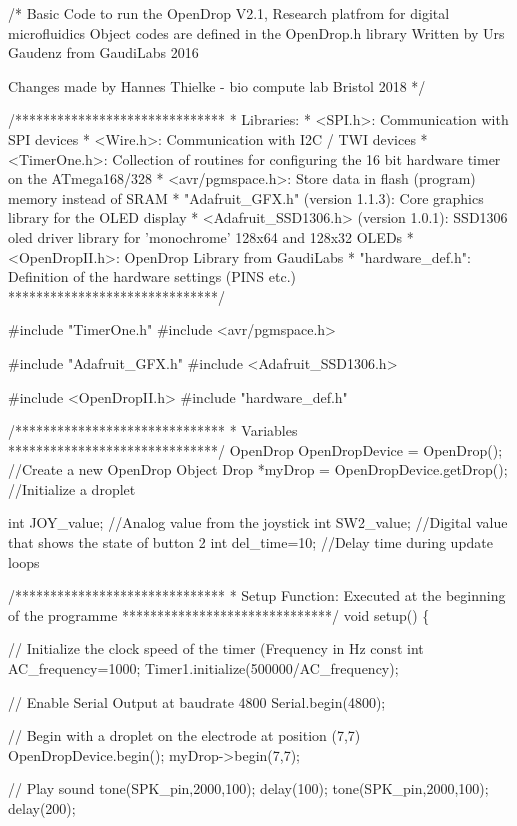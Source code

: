 \begin{DoxyCodeInclude}
/*
  Basic Code to run the OpenDrop V2.1, Research platfrom for digital microfluidics
  Object codes are defined in the OpenDrop.h library
  Written by Urs Gaudenz from GaudiLabs
  2016

  Changes made by Hannes Thielke - bio compute lab Bristol
  2018
 */

/******************************
 * Libraries:
 * <SPI.h>: Communication with SPI devices
 * <Wire.h>: Communication with I2C / TWI devices
 * <TimerOne.h>: Collection of routines for configuring the 16 bit hardware timer on the ATmega168/328
 * <avr/pgmspace.h>: Store data in flash (program) memory instead of SRAM
 * "Adafruit\_GFX.h" (version 1.1.3): Core graphics library for the OLED display
 * <Adafruit\_SSD1306.h> (version 1.0.1): SSD1306 oled driver library for 'monochrome' 128x64 and 128x32
       OLEDs
 * <OpenDropII.h>: OpenDrop Library from GaudiLabs
 * "hardware\_def.h": Definition of the hardware settings (PINS etc.)
 ******************************/

#include "TimerOne.h"  
#include <avr/pgmspace.h>

#include "Adafruit\_GFX.h"
#include <Adafruit\_SSD1306.h>

#include <OpenDropII.h>
#include "hardware\_def.h"

/******************************
 * Variables
 ******************************/
OpenDrop OpenDropDevice = OpenDrop();     //Create a new OpenDrop Object
Drop *myDrop = OpenDropDevice.getDrop();  //Initialize a droplet

int JOY\_value;        //Analog value from the joystick
int SW2\_value;        //Digital value that shows the state of button 2
int del\_time=10;      //Delay time during update loops

/******************************
 * Setup Function: Executed at the beginning of the programme
 ******************************/
void setup() \{

  // Initialize the clock speed of the timer (Frequency in Hz
  const int AC\_frequency=1000;
  Timer1.initialize(500000/AC\_frequency);

  // Enable Serial Output at baudrate 4800
  Serial.begin(4800);

  // Begin with a droplet on the electrode at position (7,7)
  OpenDropDevice.begin();
  myDrop->begin(7,7);

  // Play sound
  tone(SPK\_pin,2000,100);
  delay(100);
  tone(SPK\_pin,2000,100);
  delay(200);


\end{DoxyCodeInclude}
